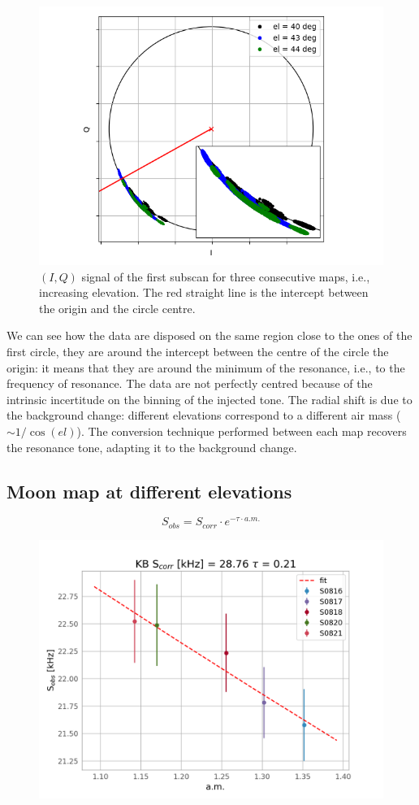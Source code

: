 \documentclass[twocolumn,traditabstract]{aa}\\
\begin{document}
\begin{figure}[htf]
	\centering
	\includegraphics[width=.5\textwidth]{4.results/autotuning.png}
	\caption{$(I,Q)$ signal of the first subscan for three consecutive maps, i.e., increasing elevation. The red straight line is the intercept between the origin and the circle centre.}
	\label{fig:autotuning}
\end{figure}

\noindent We can see how the data are disposed on the same region close to the ones of the first circle, they are around the intercept between the centre of the circle the origin: it means that they are around the minimum of the resonance, i.e., to the frequency of resonance. The data are not perfectly centred because of the intrinsic incertitude on the binning of the injected tone. The radial shift is due to the background change: different elevations correspond to a different air mass ($\sim 1/\cos(el)$). The conversion technique performed between each map recovers the resonance tone, adapting it to the background change.

\subsection{Moon map at different elevations}
\label{subsec:moon}

\begin{equation}
	S_{obs} = S_{corr}\cdot e^{ -\tau \cdot a.m. } 
\end{equation}

\begin{figure}[htf]
	\centering
	\includegraphics[width=.5\textwidth]{4.results/moon.png}
	\caption{}
	\label{fig:moon}
\end{figure}
\end{document}
